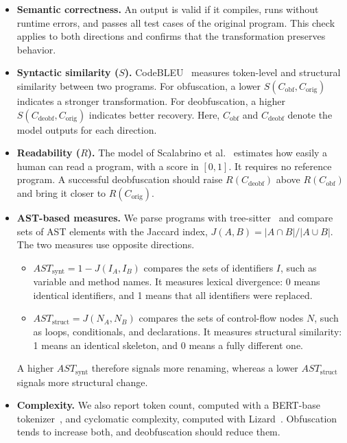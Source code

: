 \begin{itemize}[leftmargin=*]

\item \textbf{Semantic correctness.}
An output is valid if it  compiles,  runs without runtime errors, and  passes all test cases of the original program.
This check applies to both directions and confirms that the transformation preserves behavior.

\item \textbf{Syntactic similarity ($S$).}
CodeBLEU~\cite{ren2020codebleu} measures token-level and structural similarity between two programs.
For obfuscation, a lower $S(C_{\text{obf}}, C_{\text{orig}})$ indicates a stronger transformation.
For deobfuscation, a higher $S(C_{\text{deobf}}, C_{\text{orig}})$ indicates better recovery.
Here, $C_{\text{obf}}$ and $C_{\text{deobf}}$ denote the model outputs for each direction.

\item \textbf{Readability ($R$).}
The model of Scalabrino et al.~\cite{scalabrino2018readability} estimates how easily a human can read a program, with a score in $[0,1]$.
It requires no reference program.
A successful deobfuscation should raise $R(C_{\text{deobf}})$ above $R(C_{\text{obf}})$ and bring it closer to $R(C_{\text{orig}})$.

\item \textbf{AST-based measures.}
We parse programs with tree-sitter~\cite{tree-sitter} and compare sets of AST elements with the Jaccard index, $J(A,B) = |A \cap B| / |A \cup B|$.
The two measures use opposite directions.
\begin{itemize}
  \item $AST_{\text{synt}} = 1 - J(I_A, I_B)$ compares the sets of identifiers $I$, such as variable and method names.
  It measures lexical divergence: 0 means identical identifiers, and 1 means that all identifiers were replaced.
  \item $AST_{\text{struct}} = J(N_A, N_B)$ compares the sets of control-flow nodes $N$, such as loops, conditionals, and declarations.
  It measures structural similarity: 1 means an identical skeleton, and 0 means a fully different one.
\end{itemize}
A higher $AST_{\text{synt}}$ therefore signals more renaming, whereas a lower $AST_{\text{struct}}$ signals more structural change.

\item \textbf{Complexity.}
We also report token count, computed with a BERT-base tokenizer~\cite{devlin2018bert}, and cyclomatic complexity, computed with Lizard~\cite{lizardtool}.
Obfuscation tends to increase both, and deobfuscation should reduce them.


\end{itemize}
